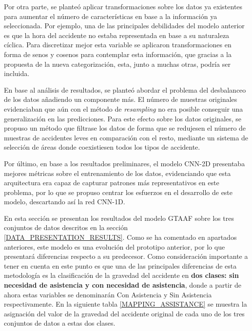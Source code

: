 Por otra parte, se planteó aplicar transformaciones sobre los datos ya existentes para aumentar el número de características en base a la información ya seleccionada. Por ejemplo, una de las principales debilidades del modelo anterior es que la hora del accidente no estaba representada en base a su naturaleza cíclica. Para discretizar mejor esta variable se aplicaron transformaciones en forma de senos y cosenos para contemplar esta información, que gracias a la propuesta de la nueva categorización, esta, junto a muchas otras, podría ser incluida.

En base al análisis de resultados, se planteó abordar el problema del desbalanceo de los datos añadiendo un componente más. El número de muestras originales evidenciaban que aún con el método de \textit{resampling} no era posible conseguir una generalización en las predicciones. Para este efecto sobre los datos originales, se propuso un método que filtrase los datos de forma que se redujesen el número de muestras de accidentes leves en comparación con el resto, mediante un sistema de selección de áreas donde coexistiesen todos los tipos de accidente.

Por último, en base a los resultados preliminares, el modelo CNN-2D presentaba mejores métricas sobre el entrenamiento de los datos, evidenciando que esta arquitectura era capaz de capturar patrones más representativos en este problema, por lo que se propuso centrar los esfuerzos en el desarrollo de este modelo, descartando así la red CNN-1D. 


En esta sección se presentan los resultados del modelo GTAAF sobre los tres conjuntos de datos descritos en la sección \ref{DATA_PRESENTATION_RESULTS}. Como se ha comentado en apartados anteriores, este modelo es una evolución del prototipo anterior, por lo que presentará diferencias respecto a su predecesor.  Como consideración importante a tener en cuenta en este punto es que una de las principales diferencias de esta metodología es la clasificación de la gravedad del accidente en \textbf{dos clases: sin necesidad de asistencia y con necesidad de asistencia}, donde a partir de ahora estas variables se denominarán Con Asistencia y Sin Asistencia respectivamente. En la siguiente tabla \ref{MAPPING_ASSISTANCE} se muestra la asignación del valor de la gravedad del accidente original de cada uno de los tres conjuntos de datos a estas dos clases.


